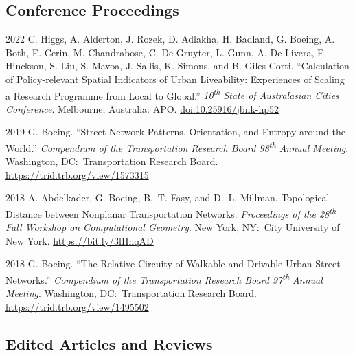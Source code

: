 \documentclass[12pt,letterpaper]{report}
\begin{document}
    \subsection*{Conference Proceedings}

    \begin{tablist}
    	
    	\item[2022] \tab{}C. Higgs, A. Alderton, J. Rozek, D. Adlakha, H. Badland, G. Boeing, A. Both, E. Cerin, M. Chandrabose, C. De Gruyter, L. Gunn, A. De Livera, E. Hinckson, S. Liu, S. Mavoa, J. Sallis, K. Simons, and B. Giles-Corti. \enquote{Calculation of Policy-relevant Spatial Indicators of Urban Liveability: Experiences of Scaling a Research Programme from Local to Global.} \textit{10\textsuperscript{th} State of Australasian Cities Conference}. Melbourne, Australia: APO. \href{https://doi.org/10.25916/jbnk-hp52}{doi:10.25916/jbnk-hp52}

        \item[2019] \tab{}G. Boeing. \enquote{Street Network Patterns, Orientation, and Entropy around the World.} \textit{Compendium of the Transportation Research Board 98\textsuperscript{th} Annual Meeting}. Washington, DC:\ Transportation Research Board. \href{https://trid.trb.org/view/1573315}{https://trid.trb.org/view/1573315}

        \item[2018] \tab{}A. Abdelkader, G. Boeing, B.~T. Fasy, and D.~L. Millman. Topological Distance between Nonplanar Transportation Networks. \textit{Proceedings of the 28\textsuperscript{th} Fall Workshop on Computational Geometry}. New York, NY:\ City University of New York. \href{https://bit.ly/3lHhqAD}{https://bit.ly/3lHhqAD}

        \item[2018] \tab{}G. Boeing. \enquote{The Relative Circuity of Walkable and Drivable Urban Street Networks.} \textit{Compendium of the Transportation Research Board 97\textsuperscript{th} Annual Meeting}. Washington, DC:\ Transportation Research Board. \href{https://trid.trb.org/view/1495502}{https://trid.trb.org/view/1495502}

    \end{tablist}



    \subsection*{Edited Articles and Reviews}
\end{document}
